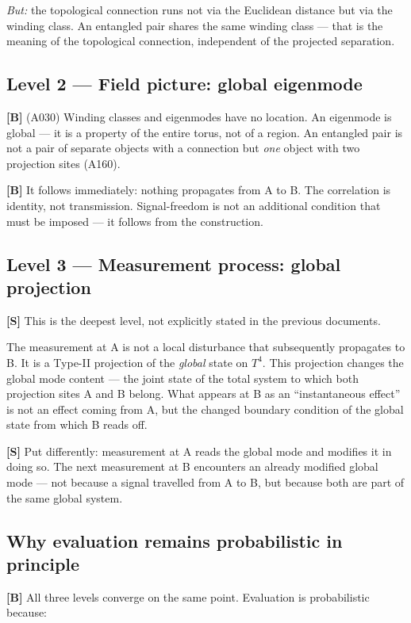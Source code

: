 \emph{But:} the topological connection runs not via the Euclidean
distance but via the winding class. An entangled pair shares the same
winding class --- that is the meaning of the topological connection,
independent of the projected separation.

\subsection{Level 2 --- Field picture: global eigenmode}

\textbf{[B]} (A030) Winding classes and eigenmodes have no location.
An eigenmode is global --- it is a property of the entire torus, not
of a region. An entangled pair is not a pair of separate objects with
a connection but \emph{one} object with two projection sites (A160).

\textbf{[B]} It follows immediately: nothing propagates from A to B.
The correlation is identity, not transmission. Signal-freedom is not
an additional condition that must be imposed --- it follows from the
construction.

\subsection{Level 3 --- Measurement process: global projection}

\textbf{[S]} This is the deepest level, not explicitly stated in the
previous documents.

The measurement at A is not a local disturbance that subsequently
propagates to B. It is a Type-II projection of the \emph{global}
state on $T^4$. This projection changes the global mode content ---
the joint state of the total system to which both projection sites
A and B belong. What appears at B as an \enquote{instantaneous effect}
is not an effect coming from A, but the changed boundary condition of
the global state from which B reads off.

\textbf{[S]} Put differently: measurement at A reads the global mode
and modifies it in doing so. The next measurement at B encounters an
already modified global mode --- not because a signal travelled from A
to B, but because both are part of the same global system.

\subsection{Why evaluation remains probabilistic in principle}

\textbf{[B]} All three levels converge on the same point.
Evaluation is probabilistic because:

